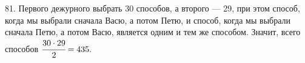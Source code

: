 81. Первого дежурного выбрать 30 способов, а второго --- 29, при этом способ, когда мы выбрали сначала Васю, а потом Петю, и способ, когда мы выбрали сначала Петю, а потом Васю, является одним и тем же способом. Значит, всего способов $\cfrac{30\cdot29}{2}=435.$\\
